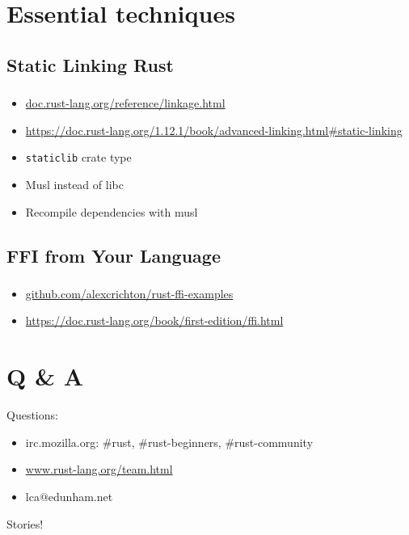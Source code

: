 \documentclass{beamer}
\begin{document}
\section{Essential techniques}

\subsection{Static Linking Rust}

\begin{frame}[fragile]
\frametitle{\insertsubsectionhead}

\begin{itemize}
\item \url{doc.rust-lang.org/reference/linkage.html}
\item \url{https://doc.rust-lang.org/1.12.1/book/advanced-linking.html#static-linking}
\item \verb|staticlib| crate type
\item Musl instead of libc
\item Recompile dependencies with musl
\end{itemize}

\end{frame}


\subsection{FFI from Your Language}

\begin{frame}[fragile]
\frametitle{\insertsubsectionhead}
\begin{itemize}
\item \url{github.com/alexcrichton/rust-ffi-examples}
\item \url{https://doc.rust-lang.org/book/first-edition/ffi.html}
\end{itemize}
\end{frame}
\section{Q \& A}

\begin{frame}[fragile]
Questions:
\begin{itemize}
\item irc.mozilla.org: \#rust, \#rust-beginners, \#rust-community
\item \url{www.rust-lang.org/team.html}
\item lca$@$edunham.net
\end{itemize} \pause
Stories!

\end{frame}
\end{document}
